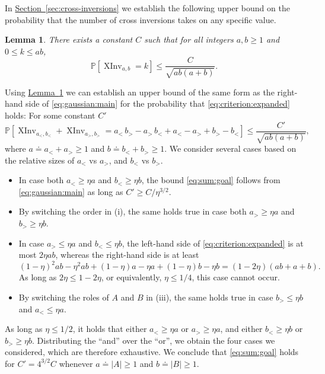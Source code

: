 \documentclass[11pt]{article}
\numberwithin{equation}{section}
\newtheorem{lemma}[theorem]{Lemma}
\theoremstyle{definition}
\theoremstyle{plain}
\newcommand{\expref}[2]{\hyperref[#2]{#1~\ref{#2}}}
\renewcommand{\Pr}{\mathbb{P}}
\newcommand{\XInvD}{\XInv}
\DeclareMathOperator{\XInv}{XInv}
\begin{document}
In \expref{Section}{sec:cross-inversions} we establish the following upper bound on the probability that the number of cross inversions takes on any specific value.
\begin{lemma}\label{thm:gaussian:main}
There exists a constant $C$ such that for all integers $a,b\ge 1$ and $0\le k\le ab$, 
\begin{equation}\label{eq:gaussian:main}
\Pr[\XInvD_{a,b}=k]\le \frac{C}{\sqrt{ab(a+b)}}. 
\end{equation}
\end{lemma}
Using \expref{Lemma}{thm:gaussian:main} we can establish an upper bound of the same form as the right-hand side of \eqref{eq:gaussian:main} for the probability that \eqref{eq:criterion:expanded} holds: For some constant $C'$
\begin{equation}\label{eq:sum:goal}
\Pr[ \XInvD_{a_<,b_<} + \XInvD_{a_>,b_>} = a_< \, b_> - a_> \, b_< + a_< - a_> + b_> - b_<] \le \frac{C'}{\sqrt{ab(a+b)}}, 
\end{equation}
where $a \doteq a_< + a_> \ge 1$ and $b \doteq b_< + b_> \ge 1$.
We consider several cases based on the relative sizes of $a_<$ vs $a_>$, and $b_<$ vs $b_>$.
\begin{itemize}
\item[(i)] In case both $a_< \ge \eta a$ and $b_< \ge \eta b$, the bound \eqref{eq:sum:goal} follows from \eqref{eq:gaussian:main} as long as $C' \ge C / \eta^{3/2}$. 
\item[(ii)] By switching the order in (i), the same holds true in case both $a_> \ge \eta a$ and $b_> \ge \eta b$.
\item[(iii)] In case $a_> \le \eta a$ and $b_< \le \eta b$, the left-hand side of \eqref{eq:criterion:expanded} is at most $2 \eta ab$, whereas the right-hand side is at least
\[ (1-\eta)^2 ab - \eta^2 ab + (1-\eta)a - \eta a + (1-\eta)b - \eta b 
= (1-2\eta)(ab+a+b). \]
As long as $2 \eta \le 1-2\eta$, or equivalently, $\eta \le 1/4$, this case cannot occur.
\item[(iv)] By switching the roles of $A$ and $B$ in (iii), the same holds true in case $b_> \le \eta b$ and $a_< \le \eta a$.
\end{itemize}
As long as $\eta \le 1/2$, it holds that either $a_< \ge \eta a$ or $a_> \ge \eta a$, and either $b_< \ge \eta b$ or $b_> \ge \eta b$. 
Distributing the “and” over the “or”, we obtain the four cases we considered, which are therefore exhaustive. We conclude that \eqref{eq:sum:goal} holds for $C' = 4^{3/2} C$ whenever $a \doteq |A| \ge 1$ and $b \doteq |B| \ge 1$. 
\end{document}
